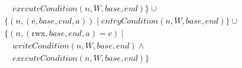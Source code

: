 \documentclass{article}
\newcommand{\sem}[1]{\left\llbracket #1 \right\rrbracket}
\newcommand{\union}{\mathbin{\cup}}
\DeclareMathOperator{\dom}{dom}
\newcommand{\var}[1]{\mathit{#1}}
\newcommand{\pcreg}{\mathrm{pc}}
\newcommand{\addr}{\var{a}}
\newcommand{\start}{\var{base}}
\newcommand{\addrend}{\var{end}}
\newcommand{\heapseg}{\var{hs}}
\newcommand{\perm}{\var{perm}}
\newcommand{\stdcap}[1][\perm]{\left(#1,\start,\addrend,\addr \right)}
\newcommand{\plainfun}[1]{\mathit{#1}}
\newcommand{\writeCond}[1]{\plainfun{writeCondition}(#1)}
\newcommand{\execCond}[1]{\plainfun{executeCondition}(#1)}
\newcommand{\entryCond}[1]{\plainfun{entryCondition}(#1)}
\newcommand{\future}{\mathbin{\sqsupseteq}}
\newcommand{\asmType}{\plaindom{AsmType}}
\newcommand{\plaindom}[1]{\mathrm{#1}}
\newcommand{\RegionName}{\plaindom{RegionName}}
\newcommand{\intr}[2]{\mathcal{#1}\sem{#2}}
\newcommand{\valueintr}[1]{\intr{V}{#1}}
\newcommand{\exprintr}[1]{\intr{E}{#1}}
\newcommand{\stdvr}{\valueintr{\asmType}}
\newcommand{\stder}{\exprintr{\asmType}}
\newcommand{\npair}[2][n]{\left(#1,#2 \right)}
\newcommand{\plainperm}[1]{\mathrm{#1}}
\newcommand{\exec}{\plainperm{rx}}
\newcommand{\entry}{\plainperm{e}}
\newcommand{\rwx}{\plainperm{rwx}}
\begin{document}
\begin{align*}
                   & \quad \execCond{n,W,\start,\addrend} \}
\union \\
                   & \{ \npair{\stdcap[\entry]} \mid \entryCond{n,W,\start,\addrend} \} \union \\
                   & \{ \npair{\stdcap[\rwx] = c} \mid \\
                   & \quad \writeCond{n,W,\start,\addrend} \land \\
                   & \quad \execCond{n,W,\start,\addrend} \}

\end{align*}
\end{document}
